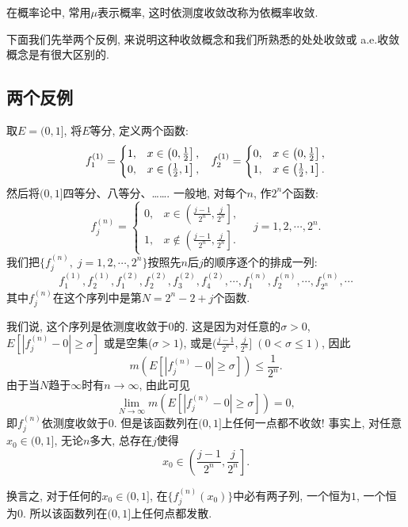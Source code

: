 在概率论中, 常用$\mu$表示概率, 这时依测度收敛改称为依概率收敛. 

下面我们先举两个反例, 来说明这种收敛概念和我们所熟悉的处处收敛或 a.e.收敛概念是有很大区别的.
\subsection{两个反例}

\begin{example}
	 \par 
	取$E = (0,1]$, 将$E$等分, 定义两个函数: 
	$$
	\begin{array}{c c}
		f_1^{(1)} = 
		\begin{cases}
			1, & x \in \left(0, \frac{1}{2} \right], \\
			0, & x \in \left(\frac{1}{2}, 1 \right],
		\end{cases}
		& 
		f_2^{(1)} = 
		\begin{cases}
			0, & x \in \left(0, \frac{1}{2} \right], \\
			1, & x \in \left(\frac{1}{2}, 1 \right].
		\end{cases}
	\end{array}
	$$
	然后将$(0,1]$四等分、八等分、……. 一般地, 对每个$n$, 作$2^n$个函数: 
	$$
	f_j^{(n)} = 
		\begin{cases}
			0, & x \in \left(\frac{j-1}{2^n}, \frac{j}{2^n} \right], \\
			1, & x \notin \left(\frac{j-1}{2^n}, \frac{j}{2^n} \right].
		\end{cases}
	\quad j = 1,2,\cdots,2^n.
	$$
	我们把$\{ f_j^{(n)},\; j = 1,2,\cdots,2^n \}$按照先$n$后$j$的顺序逐个的排成一列:
	$$
		f_1^{(1)}, f_2^{(1)}, 
		f_1^{(2)}, f_2^{(2)}, f_3^{(2)}, f_4^{(2)}, 
		\cdots, 
		f_1^{(n)}, f_2^{(n)}, \cdots, f_{2^n}^{(n)}, 
		\cdots
	$$
	其中$f_j^{(n)}$在这个序列中是第$N = 2^n - 2 +j$个函数. 
	
	我们说, 这个序列是依测度收敛于$0$的. 
	这是因为对任意的$\sigma > 0$, $E[|f_j^{(n)} - 0| \geq \sigma]$
	或是空集($\sigma >1$), 
	或是$(\frac{j-1}{2^n}, \frac{j}{2^n}] \; (0 < \sigma \leq 1)$, 
	因此
	$$
		m( E[|f_j^{(n)} - 0| \geq \sigma] ) \leq \frac{1}{2^n}. 
	$$
	由于当$N$趋于$\infty$时有$n \to \infty$, 由此可见
	$$
		\lim\limits_{N \to \infty} m( E[|f_j^{(n)} - 0| \geq \sigma] ) = 0, 
	$$
	即$f_j^{(n)}$依测度收敛于$0$. 
	但是该函数列在$(0,1]$上任何一点都不收敛! 
	事实上, 对任意$x_0 \in (0,1]$, 无论$n$多大, 总存在$j$使得
	$$
		x_0 \in \left(\frac{j-1}{2^n}, \frac{j}{2^n} \right].
	$$
	
	换言之, 对于任何的$x_0 \in (0,1]$, 
	在$\{ f_j^{(n)}(x_0) \}$中必有两子列, 一个恒为$1$, 一个恒为$0$. 
	所以该函数列在$(0,1]$上任何点都发散. 
\end{example}

